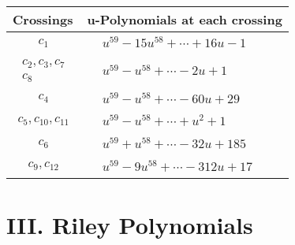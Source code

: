 \documentclass[1p]{elsarticle_modified}
\theoremstyle{definition}
\begin{document}
\begin{tabular}{m{50pt}|m{274pt}}
Crossings & \hspace{64pt}u-Polynomials at each crossing \\
\hline $$\begin{aligned}c_{1}\end{aligned}$$&$\begin{aligned}
&u^{59}-15 u^{58}+\cdots+16 u-1
\end{aligned}$\\
\hline $$\begin{aligned}c_{2},c_{3},c_{7}\\c_{8}\end{aligned}$$&$\begin{aligned}
&u^{59}- u^{58}+\cdots-2 u+1
\end{aligned}$\\
\hline $$\begin{aligned}c_{4}\end{aligned}$$&$\begin{aligned}
&u^{59}- u^{58}+\cdots-60 u+29
\end{aligned}$\\
\hline $$\begin{aligned}c_{5},c_{10},c_{11}\end{aligned}$$&$\begin{aligned}
&u^{59}- u^{58}+\cdots+u^2+1
\end{aligned}$\\
\hline $$\begin{aligned}c_{6}\end{aligned}$$&$\begin{aligned}
&u^{59}+u^{58}+\cdots-32 u+185
\end{aligned}$\\
\hline $$\begin{aligned}c_{9},c_{12}\end{aligned}$$&$\begin{aligned}
&u^{59}-9 u^{58}+\cdots-312 u+17
\end{aligned}$\\
\hline
\end{tabular}\newpage\renewcommand{\arraystretch}{1}
\centering \section*{ III. Riley Polynomials}
\end{document}
